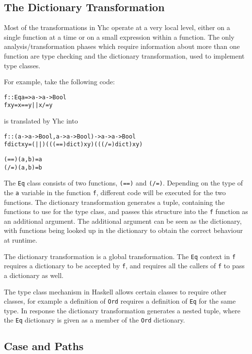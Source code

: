 \documentclass[preprint]{sigplanconf}
\newcommand{\T}[1]{\texttt{#1}}
\newenvironment{code}{\begin{alltt}\small}{\end{alltt}}
\begin{document}
\subsection{The Dictionary Transformation}

Most of the transformations in Yhc operate at a very local level, either on a
single function at a time or on a small expression within a function. The only
analysis/transformation phases which require information about more than one
function are type checking and the dictionary transformation, used to implement
type classes.

For example, take the following code:

\begin{code}
 f :: Eq a => a -> a -> Bool
 f x y = x == y || x /= y
\end{code}

is translated by Yhc into

\begin{code}
 f :: (a -> a -> Bool, a -> a -> Bool) -> a -> a -> Bool
 f dict x y = (||) (((==) dict) x y) (((/=) dict) x y)

 (==) (a,b) = a
 (/=) (a,b) = b
\end{code}

The \T{Eq} class consists of two functions, \T{(==)} and \T{(/=)}. Depending on
the type of the \T{a} variable in the function \T{f}, different code will be
executed for the two functions. The dictionary transformation generates a
tuple, containing the functions to use for the type class, and passes this
structure into the \T{f} function as an additional argument. The additional
argument can be seen as the dictionary, with functions being looked up in the
dictionary to obtain the correct behaviour at runtime.

The dictionary transformation is a global transformation. The \T{Eq} context in
\T{f} requires a dictionary to be accepted by \T{f}, and requires all the
callers of \T{f} to pass a dictionary as well.

The type class mechanism in Haskell allows certain classes to require other
classes, for example a definition of \T{Ord} requires a definition of \T{Eq}
for the same type. In response the dictionary transformation generates a nested
tuple, where the \T{Eq} dictionary is given as a member of the \T{Ord}
dictionary.

\subsection{Case and Paths}
\end{document}
